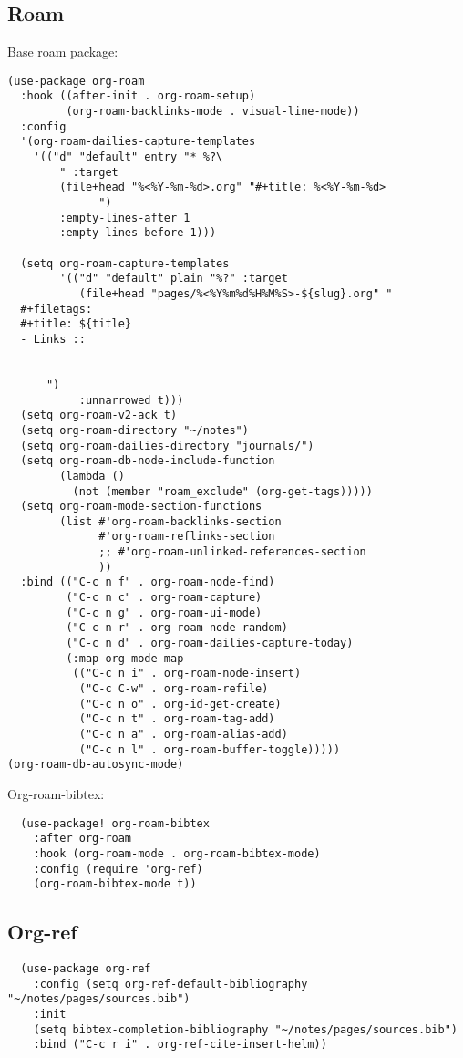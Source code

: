 \documentclass[11pt]{article}
\begin{document}
\subsection{Roam}
\label{sec:org53f63b1}
Base roam package:
\begin{verbatim}
(use-package org-roam
  :hook ((after-init . org-roam-setup)
         (org-roam-backlinks-mode . visual-line-mode))
  :config
  '(org-roam-dailies-capture-templates
    '(("d" "default" entry "* %?\
        " :target
        (file+head "%<%Y-%m-%d>.org" "#+title: %<%Y-%m-%d>
              ")
        :empty-lines-after 1
        :empty-lines-before 1)))

  (setq org-roam-capture-templates
        '(("d" "default" plain "%?" :target
           (file+head "pages/%<%Y%m%d%H%M%S>-${slug}.org" "
  #+filetags:
  #+title: ${title}
  - Links ::


      ")
           :unnarrowed t)))
  (setq org-roam-v2-ack t)
  (setq org-roam-directory "~/notes")
  (setq org-roam-dailies-directory "journals/")
  (setq org-roam-db-node-include-function
        (lambda ()
          (not (member "roam_exclude" (org-get-tags)))))
  (setq org-roam-mode-section-functions
        (list #'org-roam-backlinks-section
              #'org-roam-reflinks-section
              ;; #'org-roam-unlinked-references-section
              ))
  :bind (("C-c n f" . org-roam-node-find)
         ("C-c n c" . org-roam-capture)
         ("C-c n g" . org-roam-ui-mode)
         ("C-c n r" . org-roam-node-random)
         ("C-c n d" . org-roam-dailies-capture-today)
         (:map org-mode-map
          (("C-c n i" . org-roam-node-insert)
           ("C-c C-w" . org-roam-refile)
           ("C-c n o" . org-id-get-create)
           ("C-c n t" . org-roam-tag-add)
           ("C-c n a" . org-roam-alias-add)
           ("C-c n l" . org-roam-buffer-toggle)))))
(org-roam-db-autosync-mode)
\end{verbatim}

Org-roam-bibtex:
\begin{verbatim}
  (use-package! org-roam-bibtex
    :after org-roam
    :hook (org-roam-mode . org-roam-bibtex-mode)
    :config (require 'org-ref)
    (org-roam-bibtex-mode t))
\end{verbatim}

\subsection{Org-ref}
\label{sec:org76e6a25}
\begin{verbatim}
  (use-package org-ref
    :config (setq org-ref-default-bibliography "~/notes/pages/sources.bib")
    :init
    (setq bibtex-completion-bibliography "~/notes/pages/sources.bib")
    :bind ("C-c r i" . org-ref-cite-insert-helm))
\end{verbatim}
\end{document}
